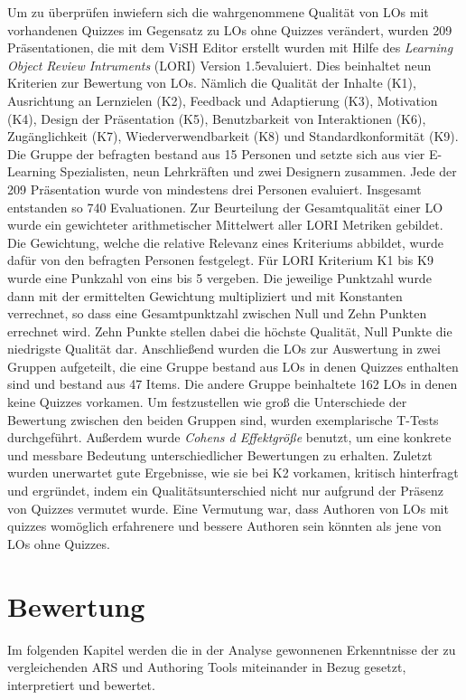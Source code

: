 \documentclass[conference]{IEEEtran}
\begin{document}
Um zu überprüfen inwiefern sich die wahrgenommene Qualität von LOs mit vorhandenen Quizzes im Gegensatz zu LOs ohne Quizzes verändert, wurden 209 Präsentationen, die mit dem ViSH Editor erstellt wurden mit Hilfe des \emph{Learning Object Review Intruments} (LORI) Version 1.5\cite{Leacock2007}evaluiert. Dies beinhaltet neun Kriterien zur Bewertung von LOs. Nämlich die Qualität der Inhalte (K1), Ausrichtung an Lernzielen (K2), Feedback und Adaptierung (K3), Motivation (K4), Design der Präsentation (K5), Benutzbarkeit von Interaktionen (K6), Zugänglichkeit (K7), Wiederverwendbarkeit (K8) und Standardkonformität (K9). Die Gruppe der befragten bestand aus 15 Personen und setzte sich aus vier E-Learning Spezialisten, neun Lehrkräften und zwei Designern zusammen. Jede der 209 Präsentation wurde von mindestens drei Personen evaluiert. Insgesamt entstanden so 740 Evaluationen. Zur Beurteilung der Gesamtqualität einer LO wurde ein gewichteter arithmetischer Mittelwert aller LORI Metriken gebildet. Die Gewichtung, welche die relative Relevanz eines Kriteriums abbildet, wurde dafür von den befragten Personen festgelegt. Für LORI Kriterium K1 bis K9 wurde eine Punkzahl von eins bis 5 vergeben. Die jeweilige Punktzahl wurde dann mit der ermittelten Gewichtung multipliziert und mit Konstanten verrechnet, so dass eine Gesamtpunktzahl zwischen Null und Zehn Punkten errechnet wird. Zehn Punkte stellen dabei die höchste Qualität, Null Punkte die
niedrigste Qualität dar. Anschließend wurden die LOs zur Auswertung in zwei Gruppen aufgeteilt, die eine Gruppe bestand aus LOs in denen Quizzes enthalten sind und bestand aus 47 Items. Die andere Gruppe beinhaltete 162 LOs in denen keine Quizzes vorkamen. Um festzustellen wie groß die Unterschiede der Bewertung zwischen den beiden Gruppen sind, wurden exemplarische T-Tests durchgeführt. Außerdem wurde \emph{Cohens d Effektgröße} \cite{CohenJ1992} benutzt, um eine konkrete und messbare Bedeutung unterschiedlicher Bewertungen zu erhalten. Zuletzt wurden unerwartet gute Ergebnisse, wie sie bei K2 vorkamen, kritisch hinterfragt und ergründet, indem ein Qualitätsunterschied nicht nur aufgrund der Präsenz von Quizzes vermutet wurde. Eine Vermutung war, dass Authoren von LOs mit quizzes womöglich erfahrenere und bessere Authoren sein könnten als jene von LOs ohne Quizzes.

\section{Bewertung}
Im folgenden Kapitel werden die in der Analyse gewonnenen Erkenntnisse der zu vergleichenden ARS und Authoring Tools miteinander in Bezug gesetzt, interpretiert und bewertet.
\end{document}
